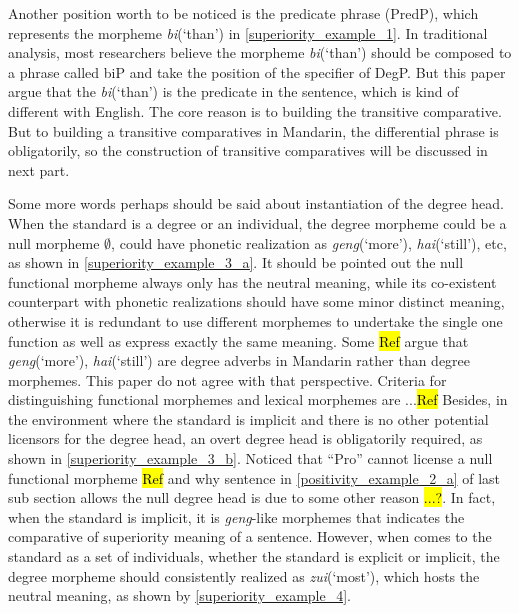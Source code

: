 \documentclass{ctexart}
\begin{document}
Another position worth to be noticed is the predicate phrase (PredP), which represents the morpheme \textit{bi}(`than') in \ref{superiority_example_1}. In traditional analysis, most researchers believe the morpheme \textit{bi}(`than') should be composed to a phrase called biP and take the position of the specifier of DegP. But this paper argue that the \textit{bi}(`than') is the predicate in the sentence, which is kind of different with English. The core reason is to building the transitive comparative. But to building a transitive comparatives in Mandarin, the differential phrase is obligatorily, so the construction of transitive comparatives will be discussed in next part.

Some more words perhaps should be said about instantiation of the degree head. When the standard is a degree or an individual, the degree morpheme could be a null morpheme $\emptyset$, could have phonetic realization as \textit{geng}(`more'), \textit{hai}(`still'), etc, as shown in \ref{superiority_example_3_a}. It should be pointed out the null functional morpheme  always only has the neutral meaning, while its co-existent counterpart with phonetic realizations should have some minor distinct meaning, otherwise it is redundant to use  different morphemes to undertake the single one function as well as express exactly the same meaning. Some \hl{Ref} argue that \textit{geng}(`more'), \textit{hai}(`still') are degree adverbs in Mandarin rather than degree morphemes. This paper do not agree with that perspective. Criteria for distinguishing functional morphemes and lexical morphemes are ...\hl{Ref} Besides, in the environment where the standard is implicit and there is no other potential licensors for the degree head, an overt degree head is obligatorily required, as shown in \ref{superiority_example_3_b}. Noticed that ``Pro'' cannot license a null functional morpheme \hl{Ref} and why sentence in \ref{positivity_example_2_a} of last sub section allows the null degree head is due to some other reason \hl{...?}. In fact, when the standard is implicit, it is \textit{geng}-like morphemes that indicates the comparative of superiority meaning of a sentence. However, when comes to the standard as a set of individuals, whether the standard is explicit or implicit, the degree morpheme should consistently realized as \textit{zui}(`most'), which hosts the neutral meaning, as shown by \ref{superiority_example_4}.
\end{document}
